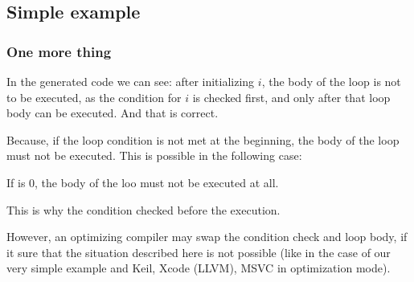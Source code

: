 \subsection{Simple example}





\subsubsection{One more thing}

In the generated code we can see: 
after initializing $i$, the body of the loop is not to be executed,
as the condition for $i$ is checked first, and only after that loop body can be executed.
And that is correct. 

Because, if the loop condition is
not met at the beginning, the body of the loop must not be executed.
This is possible in the following case:



If  is 0, the body of the loo must not be executed at all.

This is why the condition checked before the execution.

However, an optimizing compiler may swap the condition check and loop body,
if it sure that the situation described here is
not possible (like in the case of our very simple example and Keil, Xcode (LLVM), MSVC in optimization mode).
